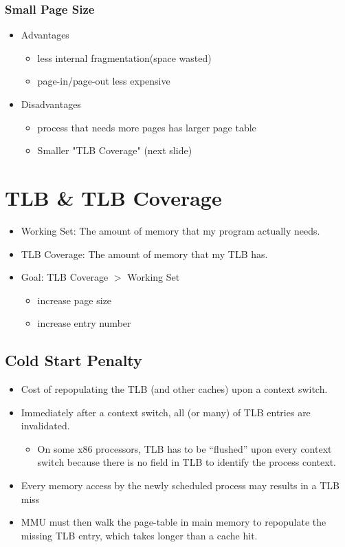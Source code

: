 \documentclass[12pt]{article}
\begin{document}
\subsubsection{Small Page Size}
\begin{itemize}
    \item Advantages \begin{itemize}
        \item less internal fragmentation(space wasted)
        \item page-in/page-out less expensive
    \end{itemize}
    \item Disadvantages \begin{itemize}
        \item process that needs more pages has larger page table
        \item Smaller "TLB Coverage" (next slide)
    \end{itemize}
\end{itemize}

\section{TLB \& TLB Coverage}
\begin{itemize}
    \item Working Set: The amount of memory that my program actually needs.
    \item TLB Coverage: The amount of memory that my TLB has.
    \item Goal: TLB Coverage $>$ Working Set \begin{itemize}
        \item increase page size
        \item increase entry number
    \end{itemize}
\end{itemize}
\subsection{Cold Start Penalty}
\begin{itemize}
    \item Cost of repopulating the TLB (and other caches) upon a context switch.
    \item Immediately after a context switch, all (or many) of TLB entries are invalidated. \begin{itemize}
        \item On some x86 processors, TLB has to be “flushed” upon every context switch because there is no field in TLB to identify the process context.
    \end{itemize}
    \item Every memory access by the newly scheduled process may results in a TLB miss
    \item MMU must then walk the page-table in main memory to repopulate the missing TLB entry, which takes longer than a cache hit.
\end{itemize}
\end{document}
